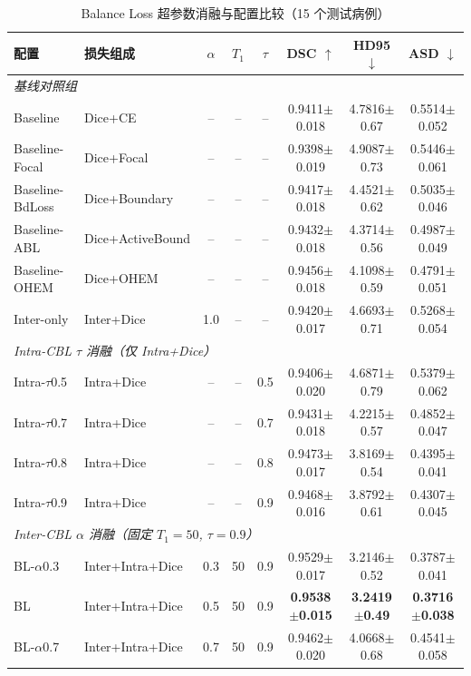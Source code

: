 \begin{table}[htbp]
  \centering
  \caption{Balance Loss 超参数消融与配置比较（15 个测试病例）}
  \label{tab:unified_loss}
  \scriptsize
  \setlength{\tabcolsep}{3.5pt}
  \begin{tabular}{llcccccc}
    \hline
    配置 & 损失组成 & $\alpha$ & $T_1$ & $\tau$ & DSC $\uparrow$ & HD95 $\downarrow$ & ASD $\downarrow$ \\
    \hline
    \multicolumn{8}{l}{\textit{基线对照组}} \\
    Baseline & Dice+CE & -- & -- & -- & 0.9411$\pm$0.018 & 4.7816$\pm$0.67 & 0.5514$\pm$0.052 \\
    Baseline-Focal & Dice+Focal & -- & -- & -- & 0.9398$\pm$0.019 & 4.9087$\pm$0.73 & 0.5446$\pm$0.061 \\
    Baseline-BdLoss & Dice+Boundary & -- & -- & -- & 0.9417$\pm$0.018 & 4.4521$\pm$0.62 & 0.5035$\pm$0.046 \\
    Baseline-ABL & Dice+ActiveBound & -- & -- & -- & 0.9432$\pm$0.018 & 4.3714$\pm$0.56 & 0.4987$\pm$0.049 \\
    Baseline-OHEM & Dice+OHEM & -- & -- & -- & 0.9456$\pm$0.018 & 4.1098$\pm$0.59 & 0.4791$\pm$0.051 \\
    Inter-only & Inter+Dice & 1.0 & -- & -- & 0.9420$\pm$0.017 & 4.6693$\pm$0.71 & 0.5268$\pm$0.054 \\
    \hline
    \multicolumn{8}{l}{\textit{Intra-CBL $\tau$ 消融（仅 Intra+Dice）}} \\
    Intra-$\tau$0.5 & Intra+Dice & -- & -- & 0.5 & 0.9406$\pm$0.020 & 4.6871$\pm$0.79 & 0.5379$\pm$0.062 \\
    Intra-$\tau$0.7 & Intra+Dice & -- & -- & 0.7 & 0.9431$\pm$0.018 & 4.2215$\pm$0.57 & 0.4852$\pm$0.047 \\
    Intra-$\tau$0.8 & Intra+Dice & -- & -- & 0.8 & 0.9473$\pm$0.017 & 3.8169$\pm$0.54 & 0.4395$\pm$0.041 \\
    Intra-$\tau$0.9 & Intra+Dice & -- & -- & 0.9 & 0.9468$\pm$0.016 & 3.8792$\pm$0.61 & 0.4307$\pm$0.045 \\
    \hline
    \multicolumn{8}{l}{\textit{Inter-CBL $\alpha$ 消融（固定 $T_1{=}50$, $\tau{=}0.9$）}} \\
    BL-$\alpha$0.3 & Inter+Intra+Dice & 0.3 & 50 & 0.9 & 0.9529$\pm$0.017 & 3.2146$\pm$0.52 & 0.3787$\pm$0.041 \\
    BL & Inter+Intra+Dice & 0.5 & 50 & 0.9 & \textbf{0.9538$\pm$0.015} & \textbf{3.2419$\pm$0.49} & \textbf{0.3716$\pm$0.038} \\
    BL-$\alpha$0.7 & Inter+Intra+Dice & 0.7 & 50 & 0.9 & 0.9462$\pm$0.020 & 4.0668$\pm$0.68 & 0.4541$\pm$0.058 \\

\end{tabular}
\end{table}
